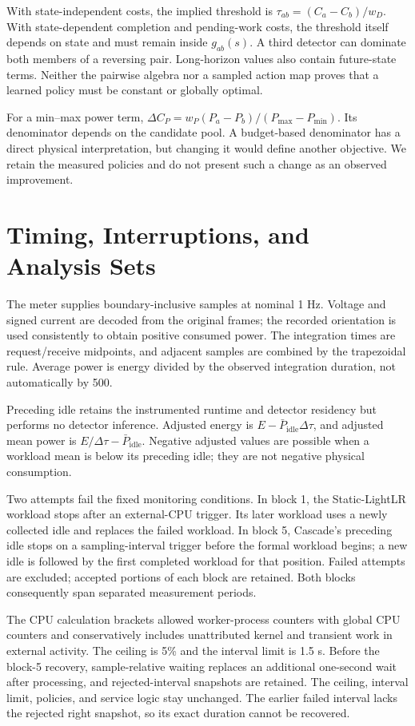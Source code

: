 \documentclass[10pt,a4paper]{article}
\begin{document}
With state-independent costs, the implied threshold is $\tau_{ab}=(C_a-C_b)/w_D$. With state-dependent completion and pending-work costs, the threshold itself depends on state and must remain inside $g_{ab}(s)$. A third detector can dominate both members of a reversing pair. Long-horizon values also contain future-state terms. Neither the pairwise algebra nor a sampled action map proves that a learned policy must be constant or globally optimal.

For a min--max power term, $\Delta C_P=w_P(P_a-P_b)/(P_{\max}-P_{\min})$. Its denominator depends on the candidate pool. A budget-based denominator has a direct physical interpretation, but changing it would define another objective. We retain the measured policies and do not present such a change as an observed improvement.

\section{Timing, Interruptions, and Analysis Sets}\label{sec:timing}
The meter supplies boundary-inclusive samples at nominal 1 Hz. Voltage and signed current are decoded from the original frames; the recorded orientation is used consistently to obtain positive consumed power. The integration times are request/receive midpoints, and adjacent samples are combined by the trapezoidal rule. Average power is energy divided by the observed integration duration, not automatically by 500.

Preceding idle retains the instrumented runtime and detector residency but performs no detector inference. Adjusted energy is $E-\bar P_{\mathrm{idle}}\Delta\tau$, and adjusted mean power is $E/\Delta\tau-\bar P_{\mathrm{idle}}$. Negative adjusted values are possible when a workload mean is below its preceding idle; they are not negative physical consumption.

Two attempts fail the fixed monitoring conditions. In block 1, the Static-LightLR workload stops after an external-CPU trigger. Its later workload uses a newly collected idle and replaces the failed workload. In block 5, Cascade's preceding idle stops on a sampling-interval trigger before the formal workload begins; a new idle is followed by the first completed workload for that position. Failed attempts are excluded; accepted portions of each block are retained. Both blocks consequently span separated measurement periods.

The CPU calculation brackets allowed worker-process counters with global CPU counters and conservatively includes unattributed kernel and transient work in external activity. The ceiling is 5\% and the interval limit is 1.5 s. Before the block-5 recovery, sample-relative waiting replaces an additional one-second wait after processing, and rejected-interval snapshots are retained. The ceiling, interval limit, policies, and service logic stay unchanged. The earlier failed interval lacks the rejected right snapshot, so its exact duration cannot be recovered.
\end{document}
